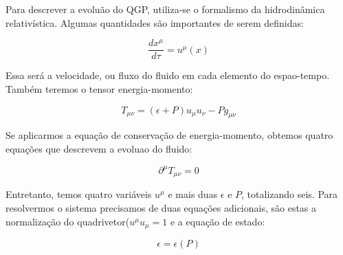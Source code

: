 Para descrever a evoluão do QGP, utiliza-se o formalismo da hidrodinâmica relativística. Algumas quantidades são
importantes de serem definidas:

\begin{equation}
 \frac{dx^{\mu}}{d\tau} = u^{\mu}(x)
\end{equation}

Essa será a velocidade, ou fluxo do fluido em cada elemento do espao-tempo. Também teremos o tensor energia-momento:

\begin{equation}
 T_{\mu \nu} = (\epsilon + P) u_\mu u_\nu - P g_{\mu \nu}
\end{equation}

Se aplicarmos a equação de conservação de energia-momento, obtemos quatro equações que descrevem a evoluao do fluido:

\begin{equation}
 \partial^\mu T_{\mu \nu} = 0
\end{equation}

Entretanto, temos quatro variáveis $u^{\mu}$ e mais duas $\epsilon$ e $P$, totalizando seis. Para resolvermos o sistema precisamos
de duas equações adicionais, são estas a normalização do quadrivetor($u^{\mu}u_{\mu}=1$ e a equação de estado:

\begin{equation}
 \epsilon=\epsilon(P)
\end{equation}


